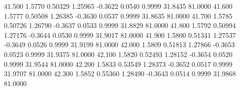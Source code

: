   41.500   1.5770   0.50329   1.25965  -0.3622   0.0540   0.9999  31.8435  81.0000
  41.600   1.5777   0.50508   1.26385  -0.3630   0.0537   0.9999  31.8635  81.0000
  41.700   1.5785   0.50726   1.26790  -0.3637   0.0533   0.9999  31.8829  81.0000
  41.800   1.5792   0.50994   1.27176  -0.3644   0.0530   0.9999  31.9017  81.0000
  41.900   1.5800   0.51341   1.27537  -0.3649   0.0526   0.9999  31.9199  81.0000
  42.000   1.5809   0.51813   1.27866  -0.3653   0.0523   0.9999  31.9375  81.0000
  42.100   1.5820   0.52493   1.28152  -0.3654   0.0520   0.9999  31.9544  81.0000
  42.200   1.5833   0.53549   1.28373  -0.3652   0.0517   0.9999  31.9707  81.0000
  42.300   1.5852   0.55360   1.28490  -0.3643   0.0514   0.9999  31.9868  81.0000
